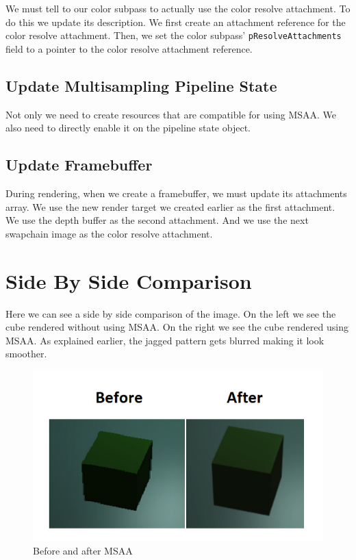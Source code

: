 We must tell to our color subpass to actually use the color resolve attachment.
To do this we update its description.
We first create an attachment reference for the color resolve attachment.
Then, we set the color subpass' \texttt{pResolveAttachments} field
to a pointer to the color resolve attachment reference.

\begin{minipage}{\linewidth}{\noindent}
    
\end{minipage}

\subsection{Update Multisampling Pipeline State}

Not only we need to create resources that are compatible for using MSAA.
We also need to directly enable it on the pipeline state object.

\begin{minipage}{\linewidth}{\noindent}
    
\end{minipage}

\subsection{Update Framebuffer}

During rendering, when we create a framebuffer, we must update
its attachments array.
We use the new render target we created earlier as the first attachment.
We use the depth buffer as the second attachment.
And we use the next swapchain image as the color resolve attachment.

\section{Side By Side Comparison}

Here we can see a side by side comparison of the image.
On the left we see the cube rendered without using MSAA.
On the right we see the cube rendered using MSAA.
As explained earlier, the jagged pattern gets blurred making it look
smoother.

\begin{figure}[H]
    \centering
    \includegraphics[scale=0.40]{images/ChMSAA/BeforeAfterMSAA.png}
    \caption{Before and after MSAA}
    \label{fig::MSAASideBySide}
\end{figure}
